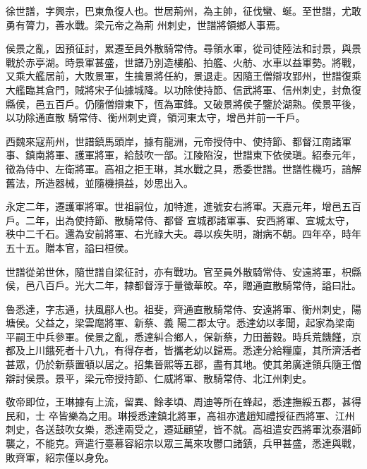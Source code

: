 
\begin{pinyinscope}

 徐世譜，字興宗，巴東魚復人也。世居荊州，為主帥，征伐蠻、蜒。至世譜，尤敢勇有膂力，善水戰。梁元帝之為荊
 州刺史，世譜將領鄉人事焉。



 侯景之亂，因預征討，累遷至員外散騎常侍。尋領水軍，從司徒陸法和討景，與景戰於赤亭湖。時景軍甚盛，世譜乃別造樓船、拍艦、火舫、水車以益軍勢。將戰，又乘大艦居前，大敗景軍，生擒景將任約，景退走。因隨王僧辯攻郢州，世譜復乘大艦臨其倉門，賊將宋子仙據城降。以功除使持節、信武將軍、信州刺史，封魚復縣侯，邑五百戶。仍隨僧辯東下，恆為軍鋒。又破景將侯子鑒於湖熟。侯景平後，以功除通直散
 騎常侍、衡州刺史資，領河東太守，增邑并前一千戶。



 西魏來寇荊州，世譜鎮馬頭岸，據有龍洲，元帝授侍中、使持節、都督江南諸軍事、鎮南將軍、護軍將軍，給鼓吹一部。江陵陷沒，世譜東下依侯瑱。紹泰元年，徵為侍中、左衛將軍。高祖之拒王琳，其水戰之具，悉委世譜。世譜性機巧，諳解舊法，所造器械，並隨機損益，妙思出入。



 永定二年，遷護軍將軍。世祖嗣位，加特進，進號安右將軍。天嘉元年，增邑五百戶。二年，出為使持節、散騎常侍、都督
 宣城郡諸軍事、安西將軍、宣城太守，秩中二千石。還為安前將軍、右光祿大夫。尋以疾失明，謝病不朝。四年卒，時年五十五。贈本官，謚曰桓侯。



 世譜從弟世休，隨世譜自梁征討，亦有戰功。官至員外散騎常侍、安遠將軍，枳縣侯，邑八百戶。光大二年，隸都督淳于量徵華皎。卒，贈通直散騎常侍，謚曰壯。



 魯悉達，字志通，扶風郿人也。祖斐，齊通直散騎常侍、安遠將軍、衡州刺史，陽塘侯。父益之，梁雲麾將軍、新蔡、義
 陽二郡太守。悉達幼以孝聞，起家為梁南平嗣王中兵參軍。侯景之亂，悉達糾合鄉人，保新蔡，力田蓄穀。時兵荒饑饉，京都及上川餓死者十八九，有得存者，皆攜老幼以歸焉。悉達分給糧廩，其所濟活者甚眾，仍於新蔡置頓以居之。招集晉熙等五郡，盡有其地。使其弟廣達領兵隨王僧辯討侯景。景平，梁元帝授持節、仁威將軍、散騎常侍、北江州刺史。



 敬帝即位，王琳據有上流，留異、餘孝頃、周迪等所在蜂起，悉達撫綏五郡，甚得民和，士
 卒皆樂為之用。琳授悉達鎮北將軍，高祖亦遣趙知禮授征西將軍、江州刺史，各送鼓吹女樂，悉達兩受之，遷延顧望，皆不就。高祖遣安西將軍沈泰潛師襲之，不能克。齊遣行臺慕容紹宗以眾三萬來攻鬱口諸鎮，兵甲甚盛，悉達與戰，敗齊軍，紹宗僅以身免。




\end{pinyinscope}
